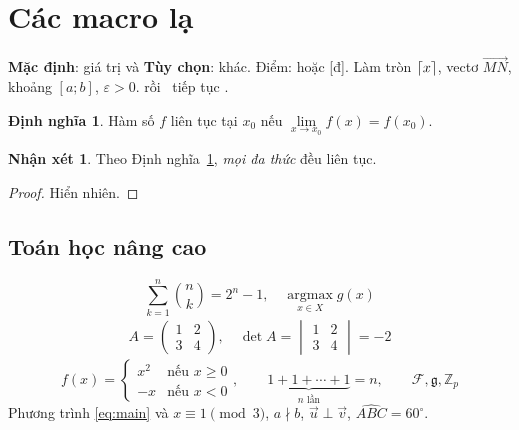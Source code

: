 \documentclass[11pt]{article}
\newcommand*{\mycmd}[2][Mặc định]{\textbf{#1}: #2}
\DeclarePairedDelimiter{\ceilx}{\lceil}{\rceil}
\def\vect#1{\overrightarrow{#1}}
\def\khoang#1;#2;{\left[#1;#2\right]}
\let\epsi\varepsilon
\theoremstyle{definition}
\newtheorem{dn}{Định nghĩa}[section]
\newtheorem*{nx}{Nhận xét}
\begin{document}
\tableofcontents
\section{Các macro lạ}
\mycmd{giá trị} và \mycmd[Tùy chọn]{khác}. Điểm:  hoặc [đ].
Làm tròn $\ceilx{x}$, vectơ $\vect{MN}$, khoảng $\khoang a;b;$, $\epsi>0$.
 rồi \lenhkhongbiet\ tiếp tục .

\begin{dn}\label{dn:1}
Hàm số $f$ liên tục tại $x_0$ nếu $\lim\limits_{x\to x_0} f(x)=f(x_0)$.
\end{dn}
\begin{nx}
Theo Định nghĩa~\ref{dn:1}, \textit{mọi đa thức} đều liên tục.
\end{nx}
\begin{proof}
Hiển nhiên.
\end{proof}

\subsection{Toán học nâng cao}
\begin{equation}\label{eq:main}
\sum_{k=1}^{n} \binom{n}{k} = 2^n - 1, \quad \operatorname*{argmax}_{x\in X} g(x)
\end{equation}
\begin{gather*}
A = \begin{pmatrix} 1 & 2 \\ 3 & 4 \end{pmatrix}, \quad \det A = \begin{vmatrix} 1 & 2\\ 3 & 4\end{vmatrix} = -2
\end{gather*}
\[
f(x)=\begin{cases} x^2 & \text{nếu } x\ge 0\\ -x & \text{nếu } x<0 \end{cases}, \qquad
\underbrace{1+1+\cdots+1}_{n \text{ lần}} = n, \qquad \mathcal{F}, \mathfrak{g}, \mathbb{Z}_p
\]
Phương trình \eqref{eq:main} và $x \equiv 1 \pmod 3$, $a \nmid b$, $\vec{u}\perp\vec{v}$, $\widehat{ABC}=60^\circ$.
\end{document}
